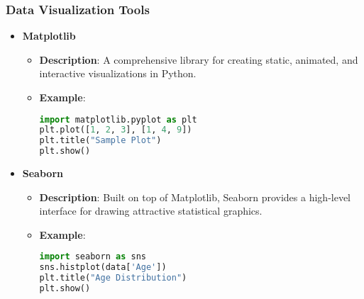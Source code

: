 \documentclass[aspectratio=169]{beamer}
\begin{document}
\begin{frame}[fragile]
    \frametitle{Data Visualization Tools}
    \begin{itemize}
        \item \textbf{Matplotlib}
        \begin{itemize}
            \item \textbf{Description}: A comprehensive library for creating static, animated, and interactive visualizations in Python.
            \item \textbf{Example}:
            \begin{lstlisting}[language=Python]
import matplotlib.pyplot as plt
plt.plot([1, 2, 3], [1, 4, 9])
plt.title("Sample Plot")
plt.show()
            \end{lstlisting}
        \end{itemize}

        \item \textbf{Seaborn}
        \begin{itemize}
            \item \textbf{Description}: Built on top of Matplotlib, Seaborn provides a high-level interface for drawing attractive statistical graphics.
            \item \textbf{Example}:
            \begin{lstlisting}[language=Python]
import seaborn as sns
sns.histplot(data['Age'])
plt.title("Age Distribution")
plt.show()
            \end{lstlisting}
        \end{itemize}
    \end{itemize}
\end{frame}
\end{document}
